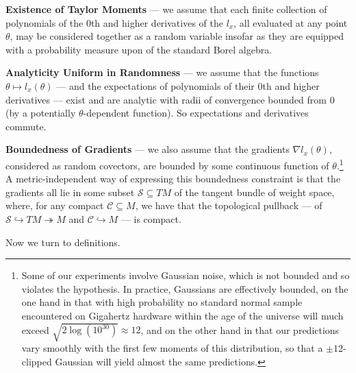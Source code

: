 \documentclass[openany, notitlepage, justified]{tufte-book}
\theoremstyle{plain}
\theoremstyle{definition}
\newcommand{\Cc}{\mathcal{C}}   \newcommand{\CC}{\mathbb{C}}
\newcommand{\Ss}{\mathcal{S}}
\begin{document}
        \textbf{Existence of Taylor Moments} --- we assume
        that each finite collection of polynomials of the $0$th and higher
        derivatives of the $l_x$, all evaluated at any point $\theta$, may be
        considered together as a random variable insofar as they are equipped
        with a probability measure upon of the standard Borel algebra.

        \textbf{Analyticity Uniform in Randomness} --- we assume that
        the functions $\theta \mapsto l_x(\theta)$ --- and the expectations
        of polynomials of their $0$th and higher derivatives --- exist and are
        analytic with radii of convergence bounded from $0$ (by a potentially
        $\theta$-dependent function).  So expectations and derivatives commute. 

        \textbf{Boundedness of Gradients} --- we also assume that the gradients
        $\nabla l_x(\theta)$, considered as random covectors, are bounded by
        some continuous function of $\theta$.\footnote{
            Some of our experiments involve Gaussian noise, which is not
            bounded and so violates the hypothesis.  In practice, Gaussians are
            effectively bounded, on the one hand in that with high
            probability no standard normal sample encountered on Gigahertz
            hardware within the age of the universe will much exceed $\sqrt{2
            \log(10^{30})} \approx 12$, and on the other hand in that
            our predictions vary smoothly with the first few moments of this
            distribution, so that a $\pm 12$-clipped Gaussian will yield almost
            the same predictions.
        }
        A metric-independent way of expressing this boundedness constraint
        is that the gradients all lie in some subset $\Ss \subseteq TM$ of
        the tangent bundle of weight space, where, for any compact $\Cc
        \subseteq M$, we have that the topological pullback --- of
        $\Ss \hookrightarrow TM \twoheadrightarrow M$
        and
        $\Cc \hookrightarrow M$ ---
        is compact.
        
        Now we turn to definitions.
\end{document}
